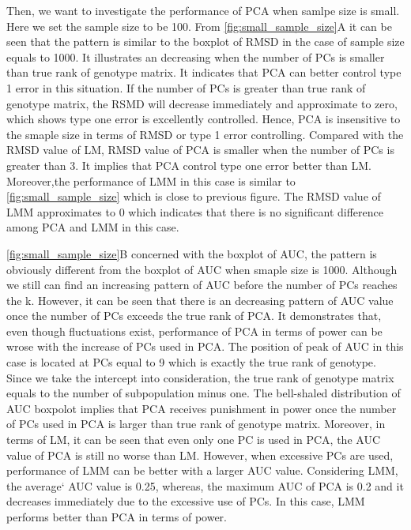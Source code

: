 \documentclass[12pt]{article}
\begin{document}
Then, we want to investigate the performance of PCA when samlpe size is small.
Here we set the sample size to be 100.
From \cref{fig:small_sample_size}A it can be seen that the pattern is similar to the boxplot of RMSD in the case of sample size equals to 1000.
It illustrates an decreasing when the number of PCs is smaller than true rank of genotype matrix.
It indicates that PCA can better control type 1 error in this situation.
If the number of PCs is greater than true rank of genotype matrix, the RSMD will decrease immediately and approximate to zero, which shows type one error is excellently controlled.
Hence, PCA is insensitive to the smaple size in terms of RMSD or type 1 error controlling.
Compared with the RMSD value of LM, RMSD value of PCA is smaller when the number of PCs is greater than 3.
It implies that PCA control type one error better than LM.
Moreover,the performance of LMM in this case is similar to \cref{fig:small_sample_size} which is close to previous figure.
The RMSD value of LMM approximates to 0 which indicates that there is no significant difference among PCA and LMM in this case.

\cref{fig:small_sample_size}B concerned with the boxplot of AUC, the pattern is obviously different from the boxplot of AUC when smaple size is 1000.
Although we still can find an increasing pattern of AUC before the number of PCs reaches the k.
However, it can be seen that there is an decreasing pattern of AUC value once the number of PCs exceeds the true rank of PCA.
It demonstrates that, even though fluctuations exist, performance of PCA in terms of power can be wrose with the increase of PCs used in PCA.
The position of peak of AUC in this case is located at PCs equal to 9 which is exactly the true rank of genotype.
Since we take the intercept into consideration, the true rank of genotype matrix equals to the number of subpopulation minus one.
The bell-shaled distribution of AUC boxpolot implies that PCA receives punishment in power once the number of PCs used in PCA is larger than true rank of genotype matrix.
Moreover, in terms of LM, it can be seen that even only one PC is used in PCA, the AUC value of PCA is still no worse than LM.
However, when excessive PCs are used, performance of LMM can be better with a larger AUC value.
Considering LMM, the average` AUC value is 0.25, whereas, the maximum AUC of PCA is 0.2 and it decreases immediately due to the excessive use of PCs.
In this case, LMM performs better than PCA in terms of power. 
\end{document}
